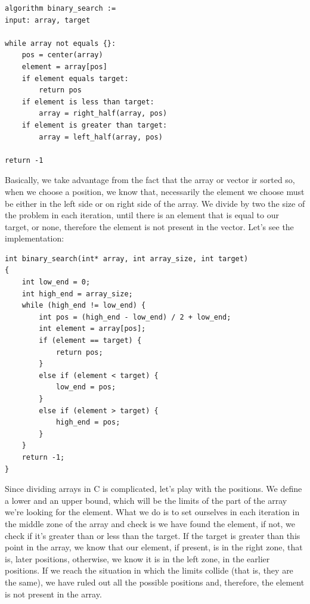 \documentclass[a4paper]{article}
\begin{document}
\noindent
\begin{minipage}[H]{\linewidth}
\begin{lstlisting}[style=pseudoCode]
algorithm binary_search :=
input: array, target

while array not equals {}:
    pos = center(array)
    element = array[pos]
    if element equals target:
        return pos
    if element is less than target:
        array = right_half(array, pos)
    if element is greater than target:
        array = left_half(array, pos)

return -1
\end{lstlisting}
\end{minipage}

Basically, we take advantage from the fact that the array or vector ir sorted
so, when we choose a position, we know that, necessarily the element we choose
must be either in the left side or on right side of the array. We divide by two
the size of the problem in each iteration, until there is an element that is
equal to our target, or none, therefore the element is not present in the
vector. Let's see the implementation:

\noindent
\begin{minipage}[H]{\linewidth}
\mbox{}
\begin{lstlisting}[style=C,
caption={Binary seach algorithm implementation},
label={lst:binarySearch}]
int binary_search(int* array, int array_size, int target)
{
    int low_end = 0;
    int high_end = array_size;
    while (high_end != low_end) {
        int pos = (high_end - low_end) / 2 + low_end;
        int element = array[pos];
        if (element == target) {
            return pos;
        }
        else if (element < target) {
            low_end = pos;
        }
        else if (element > target) {
            high_end = pos;
        }
    }
    return -1;
}
\end{lstlisting}
\end{minipage}

Since dividing arrays in C is complicated, let's play with the positions. We
define a lower and an upper bound, which will be the limits of the part of
the array we're looking for the element. What we do is to set ourselves in each
iteration in the middle zone of the array and check is we have found the
element, if not, we check if it's greater than or less than the target. If the
target is greater than this point in the array, we know that our element, if
present, is in the right zone, that is, later positions, otherwise, we know
it is in the left zone, in the earlier positions. If we reach the situation in
which the limits collide (that is, they are the same), we have ruled out all the
possible positions and, therefore, the element is not present in the array.
\end{document}
